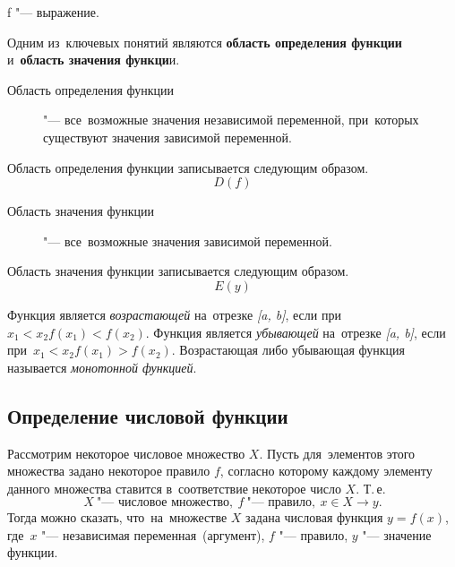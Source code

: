 \documentclass[]{scrartcl}
\begin{document}
f "--- выражение.

Одним из~ключевых понятий являются \textbf{область определения функции} и~\textbf{область значения функци}и.
\begin{description}
	\item[Область определения функции] "--- все~возможные значения независимой переменной, при~которых существуют значения зависимой переменной.
\end{description}
Область определения функции записывается следующим образом.
\begin{equation}\label{eq:function-domain}
D(f)
\end{equation}
\begin{description}
	\item[Область значения функции] "--- все~возможные значения зависимой переменной.
\end{description}
Область значения функции записывается следующим образом.
\begin{equation}\label{eq:function-exists}
E(y)
\end{equation}

Функция является \emph{возрастающей} на~отрезке \textit{[a, b]}, если при~$x_1 < x_2 f(x_1) < f(x_2)$. Функция является \emph{убывающей} на~отрезке \textit{[a, b]}, если при~$x_1 < x_2 f(x_1) > f(x_2)$. Возрастающая либо убывающая функция называется \emph{монотонной функцией}.

\subsection{Определение числовой функции}
Рассмотрим некоторое числовое множество ${\textstyle X}$. Пусть для~элементов этого множества задано некоторое правило ${\textstyle f}$, согласно которому каждому элементу данного множества ставится в~соответствие некоторое число ${\textstyle X}$. Т.\,е.
\begin{equation}\label{eq:function-def-1}
X\ \text{"--- числовое множество},\ f\ \text{"--- правило},\ x \in X \rightarrow y.
\end{equation}
Тогда можно сказать, что~на~множестве ${\textstyle X}$ задана числовая функция ${\textstyle y=f(x)}$, где~${\textstyle x}$ "--- независимая переменная~(аргумент), ${\textstyle f}$ "--- правило, ${\textstyle y}$ "--- значение функции.
\end{document}
